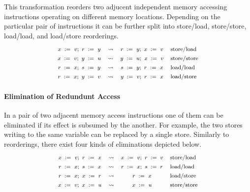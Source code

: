 This transformation reorders two 
adjucent independent memory accessing instructions
operating on different memory locations.
Depending on the particular pair of instructions
it can be further split into store/load, store/store, 
load/load, and load/store reorderings.  
%
\[\def\arraystretch{1.4}\footnotesize
  \begin{array}{cccl} 

      \writeInst{}{x}{v} \seq \readInst{}{r}{y} 
    & \leadsto 
    & \readInst{}{r}{y} \seq \writeInst{}{x}{v}
    & \text{store/load}  \\ 

      \writeInst{}{x}{v} \seq \writeInst{}{y}{u} 
    & \leadsto 
    & \writeInst{}{y}{u} \seq \writeInst{}{x}{v}
    & \text{store/store}  \\ 

      \readInst{}{r}{x} \seq \readInst{}{s}{y} 
    & \leadsto 
    & \readInst{}{s}{y} \seq \readInst{}{r}{x}
    & \text{load/load}  \\ 

      \readInst{}{r}{x} \seq \writeInst{}{y}{v} 
    & \leadsto 
    & \writeInst{}{y}{v} \seq \readInst{}{r}{x}
    & \text{load/store}  \\ 

  \end{array}
\]

\paragraph{Elimination of Redundunt Access} 

In a pair of two adjacent memory access instructions 
one of them can be eliminated if its effect 
is subsumed by the another. 
For example, the two stores writing to the same variable 
can be replaced by a single store.  
Similarly to reorderings, there exist four kinds 
of eliminations depicted below. 
%
\[\def\arraystretch{1.4}\footnotesize
  \begin{array}{cccl} 

      \writeInst{}{x}{v} \seq \readInst{}{r}{x} 
    & \leadsto 
    & \writeInst{}{x}{v} \seq \assignInst{r}{v}
    & \text{store/load}  \\ 

      \readInst{}{r}{x} \seq \readInst{}{s}{x} 
    & \leadsto 
    & \readInst{}{r}{x} \seq \assignInst{s}{r}
    & \text{load/load}  \\ 

      \readInst{}{r}{x} \seq \writeInst{}{x}{r} 
    & \leadsto 
    & \readInst{}{r}{x} 
    & \text{load/store}  \\ 

      \writeInst{}{x}{v} \seq \writeInst{}{x}{u} 
    & \leadsto 
    & \writeInst{}{x}{u}
    & \text{store/store}  \\ 

  \end{array}
\]

